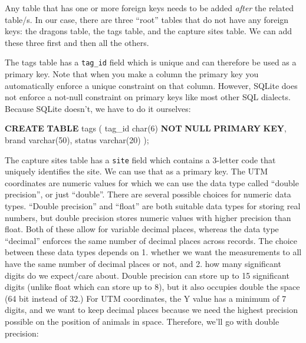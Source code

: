 \documentclass[
]{book}
\newenvironment{Shaded}{\begin{snugshade}}{\end{snugshade}}
\newcommand{\DataTypeTok}[1]{\textcolor[rgb]{0.13,0.29,0.53}{#1}}
\newcommand{\DecValTok}[1]{\textcolor[rgb]{0.00,0.00,0.81}{#1}}
\newcommand{\KeywordTok}[1]{\textcolor[rgb]{0.13,0.29,0.53}{\textbf{#1}}}
\newcommand{\NormalTok}[1]{#1}
\begin{document}
Any table that has one or more foreign keys needs to be added \emph{after} the
related table/s. In our case, there are three ``root'' tables that do not have
any foreign keys: the dragons table, the tags table, and the capture sites
table. We can add these three first and then all the others.

The tags table has a \texttt{tag\_id} field which is unique and can therefore be used as
a primary key. Note that when you make a column the primary key you automatically
enforce a unique constraint on that column. However, SQLite does not enforce a
not-null constraint on primary keys like most other SQL dialects. Because SQLite
doesn't, we have to do it ourselves:

\begin{Shaded}
\begin{Highlighting}[]

\KeywordTok{CREATE} \KeywordTok{TABLE}\NormalTok{ tags (}
\NormalTok{tag\_id }\DataTypeTok{char}\NormalTok{(}\DecValTok{6}\NormalTok{) }\KeywordTok{NOT} \KeywordTok{NULL} \KeywordTok{PRIMARY} \KeywordTok{KEY}\NormalTok{,}
\NormalTok{brand }\DataTypeTok{varchar}\NormalTok{(}\DecValTok{50}\NormalTok{),}
\NormalTok{status }\DataTypeTok{varchar}\NormalTok{(}\DecValTok{20}\NormalTok{)}
\NormalTok{);}
\end{Highlighting}
\end{Shaded}

The capture sites table has a \texttt{site} field which contains a 3-letter code that
uniquely identifies the site. We can use that as a primary key. The UTM
coordinates are numeric values for which we can use the data type called ``double
precision'', or just ``double''. There are several possible choices for numeric
data types. ``Double precision'' and ``float'' are both suitable data types for
storing real numbers, but double precision stores numeric values
with higher precision than float. Both of these allow for variable decimal
places, whereas the data type ``decimal'' enforces the same number of decimal
places across records. The choice between these data types depends on 1. whether
we want the measurements to all have the same number of decimal places or not,
and 2. how many significant digits do we expect/care about. Double precision can
store up to 15 significant digits (unlike float which can store up to 8), but it
also occupies double the space (64 bit instead of 32.) For UTM coordinates, the
Y value has a minimum of 7 digits, and we want to keep decimal places because
we need the highest precision possible on the position of animals in space.
Therefore, we'll go with double precision:
\end{document}
